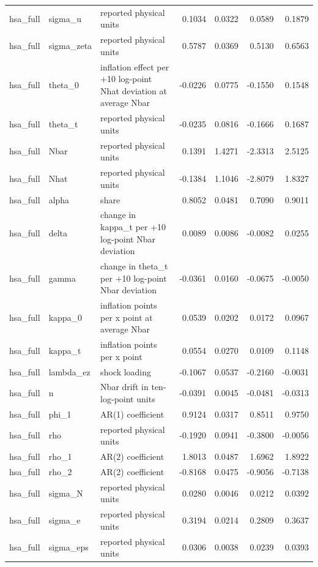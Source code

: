 \begin{tabular}{lllrrrr}
hsa\_full & sigma\_u & reported physical units & 0.1034 & 0.0322 & 0.0589 & 0.1879 \\
hsa\_full & sigma\_zeta & reported physical units & 0.5787 & 0.0369 & 0.5130 & 0.6563 \\
hsa\_full & theta\_0 & inflation effect per +10 log-point Nhat deviation at average Nbar & -0.0226 & 0.0775 & -0.1550 & 0.1548 \\
hsa\_full & theta\_t & reported physical units & -0.0235 & 0.0816 & -0.1666 & 0.1687 \\
hsa\_full & Nbar & reported physical units & 0.1391 & 1.4271 & -2.3313 & 2.5125 \\
hsa\_full & Nhat & reported physical units & -0.1384 & 1.1046 & -2.8079 & 1.8327 \\
hsa\_full & alpha & share & 0.8052 & 0.0481 & 0.7090 & 0.9011 \\
hsa\_full & delta & change in kappa\_t per +10 log-point Nbar deviation & 0.0089 & 0.0086 & -0.0082 & 0.0255 \\
hsa\_full & gamma & change in theta\_t per +10 log-point Nbar deviation & -0.0361 & 0.0160 & -0.0675 & -0.0050 \\
hsa\_full & kappa\_0 & inflation points per x point at average Nbar & 0.0539 & 0.0202 & 0.0172 & 0.0967 \\
hsa\_full & kappa\_t & inflation points per x point & 0.0554 & 0.0270 & 0.0109 & 0.1148 \\
hsa\_full & lambda\_ez & shock loading & -0.1067 & 0.0537 & -0.2160 & -0.0031 \\
hsa\_full & n & Nbar drift in ten-log-point units & -0.0391 & 0.0045 & -0.0481 & -0.0313 \\
hsa\_full & phi\_1 & AR(1) coefficient & 0.9124 & 0.0317 & 0.8511 & 0.9750 \\
hsa\_full & rho & reported physical units & -0.1920 & 0.0941 & -0.3800 & -0.0056 \\
hsa\_full & rho\_1 & AR(2) coefficient & 1.8013 & 0.0487 & 1.6962 & 1.8922 \\
hsa\_full & rho\_2 & AR(2) coefficient & -0.8168 & 0.0475 & -0.9056 & -0.7138 \\
hsa\_full & sigma\_N & reported physical units & 0.0280 & 0.0046 & 0.0212 & 0.0392 \\
hsa\_full & sigma\_e & reported physical units & 0.3194 & 0.0214 & 0.2809 & 0.3637 \\
hsa\_full & sigma\_eps & reported physical units & 0.0306 & 0.0038 & 0.0239 & 0.0393 \\

\end{tabular}
